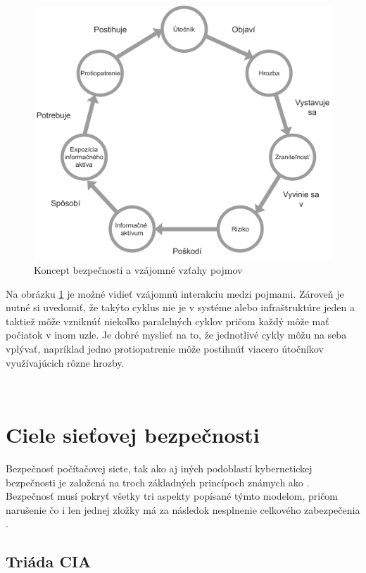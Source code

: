 	\begin{figure}[!h]
	\begin{center}
		\includegraphics[scale=0.5]{obrazky/sec_cycle.pdf}
	\end{center}
	\caption[Koncept bezpečnosti a vzájomné vzťahy pojmov]{Koncept bezpečnosti a vzájomné vzťahy pojmov \cite{McMillan2018}}
	\label{sec-cycle}
	\end{figure}

Na obrázku \ref{sec-cycle} je možné vidieť vzájomnú interakciu medzi pojmami. Zároveň je nutné si uvedomiť, že takýto cyklus nie je v systéme alebo infraštruktúre jeden a taktiež môže vzniknúť niekoľko paralelných cyklov pričom každý môže mať počiatok v inom uzle. Je dobré myslieť na to, že jednotlivé cykly môžu na seba vplývať, napríklad jedno protiopatrenie môže postihnúť viacero útočníkov využívajúcich rôzne hrozby. 

\


\section{Ciele sieťovej bezpečnosti}
Bezpečnosť počítačovej siete, tak ako aj iných podoblastí kybernetickej bezpečnosti je založená na troch základných princípoch známych ako . Bezpečnosť musí pokryť všetky tri aspekty popísané týmto modelom, pričom narušenie čo i len jednej zložky má za následok nesplnenie celkového zabezpečenia \cite{Vyncke2008}. 

\subsection{Triáda CIA}

